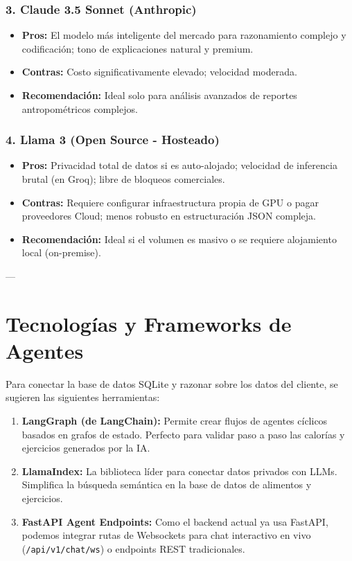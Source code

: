 \documentclass[11pt]{article}
\begin{document}
\subsubsection{3. Claude 3.5 Sonnet (Anthropic)}
\begin{itemize}
    \item \textbf{Pros:} El modelo más inteligente del mercado para razonamiento complejo y codificación; tono de explicaciones natural y premium.
    \item \textbf{Contras:} Costo significativamente elevado; velocidad moderada.
    \item \textbf{Recomendación:} Ideal solo para análisis avanzados de reportes antropométricos complejos.
\end{itemize}

\subsubsection{4. Llama 3 (Open Source - Hosteado)}
\begin{itemize}
    \item \textbf{Pros:} Privacidad total de datos si es auto-alojado; velocidad de inferencia brutal (en Groq); libre de bloqueos comerciales.
    \item \textbf{Contras:} Requiere configurar infraestructura propia de GPU o pagar proveedores Cloud; menos robusto en estructuración JSON compleja.
    \item \textbf{Recomendación:} Ideal si el volumen es masivo o se requiere alojamiento local (on-premise).
\end{itemize}

---

\section{Tecnologías y Frameworks de Agentes}
Para conectar la base de datos SQLite y razonar sobre los datos del cliente, se sugieren las siguientes herramientas:
\begin{enumerate}
    \item \textbf{LangGraph (de LangChain):} Permite crear flujos de agentes cíclicos basados en grafos de estado. Perfecto para validar paso a paso las calorías y ejercicios generados por la IA.
    \item \textbf{LlamaIndex:} La biblioteca líder para conectar datos privados con LLMs. Simplifica la búsqueda semántica en la base de datos de alimentos y ejercicios.
    \item \textbf{FastAPI Agent Endpoints:} Como el backend actual ya usa FastAPI, podemos integrar rutas de Websockets para chat interactivo en vivo (\texttt{/api/v1/chat/ws}) o endpoints REST tradicionales.
\end{enumerate}
\end{document}
